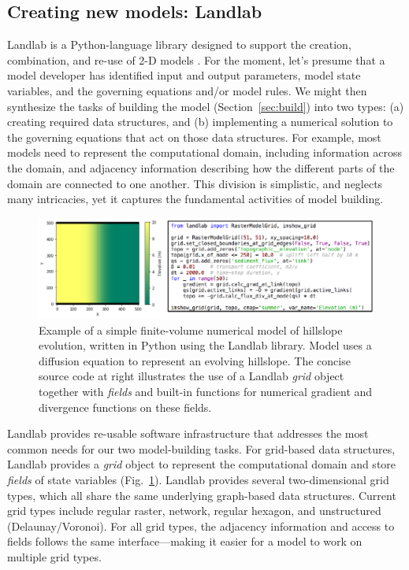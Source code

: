 \documentclass[journal abbreviation, manuscript]{copernicus}
\begin{document}
\subsection{Creating new models: Landlab}

Landlab is a Python-language library designed to support the creation, combination, and re-use of 2-D models \citep{hobley2017creative, barnhart2020short}. For the moment, let's presume that a model developer has identified input and output parameters, model state variables, and the governing equations and/or model rules. We might then synthesize the tasks of building the model (Section~\ref{sec:build}) into two types: (a) creating required data structures, and (b) implementing a numerical solution to the governing equations that act on those data structures. For example, most models need to represent the computational domain, including information  across the domain, and adjacency information describing how the different parts of the domain are connected to one another. This division is simplistic, and neglects many intricacies, yet it captures the fundamental activities of model building. 

\begin{figure}[h!]
\centering
\includegraphics{Figures/fig10.pdf}
\caption{Example of a simple finite-volume numerical model of hillslope evolution, written in Python using the Landlab library. Model uses a diffusion equation to represent an evolving hillslope. The concise source code at right illustrates the use of a Landlab \textit{grid} object together with \textit{fields} and built-in functions for numerical gradient and divergence functions on these fields.}
\label{fig:landlabdiffusion}
\end{figure}


Landlab provides re-usable software infrastructure that addresses the most common needs for our two model-building tasks. For grid-based data structures, Landlab provides a \textit{grid} object to represent the computational domain and store \textit{fields} of state variables (Fig.~\ref{fig:landlabdiffusion}). Landlab provides several two-dimensional grid types, which all share the same underlying graph-based data structures. Current grid types include regular raster, network, regular hexagon, and unstructured (Delaunay/Voronoi). For all grid types, the adjacency information and access to fields follows the same interface---making it easier for a model to work on multiple grid types.
\end{document}
